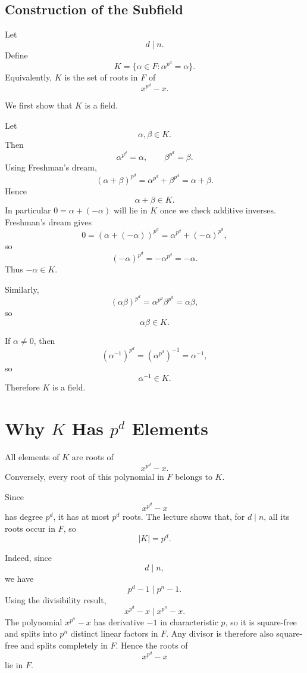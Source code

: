 \documentclass[11pt]{article}
\theoremstyle{remark}
\newcommand{\divides}{\mid}
\begin{document}
\subsection{Construction of the Subfield}

Let
\[
    d\mid n.
\]
Define
\[
    K
    =
    \{\alpha\in F:\alpha^{p^d}=\alpha\}.
\]
Equivalently, $K$ is the set of roots in $F$ of
\[
    x^{p^d}-x.
\]

We first show that $K$ is a field.

Let
\[
    \alpha,\beta\in K.
\]
Then
\[
    \alpha^{p^d}=\alpha,
    \qquad
    \beta^{p^d}=\beta.
\]
Using Freshman's dream,
\[
    (\alpha+\beta)^{p^d}
    =
    \alpha^{p^d}+\beta^{p^d}
    =
    \alpha+\beta.
\]
Hence
\[
    \alpha+\beta\in K.
\]
In particular $0=\alpha+(-\alpha)$ will lie in $K$ once we check additive
inverses. Freshman's dream gives
\[
    0=(\alpha+(-\alpha))^{p^d}
    =
    \alpha^{p^d}+(-\alpha)^{p^d},
\]
so
\[
    (-\alpha)^{p^d}=-\alpha^{p^d}=-\alpha.
\]
Thus $-\alpha\in K$.

Similarly,
\[
    (\alpha\beta)^{p^d}
    =
    \alpha^{p^d}\beta^{p^d}
    =
    \alpha\beta,
\]
so
\[
    \alpha\beta\in K.
\]

If $\alpha\neq0$, then
\[
    (\alpha^{-1})^{p^d}
    =
    (\alpha^{p^d})^{-1}
    =
    \alpha^{-1},
\]
so
\[
    \alpha^{-1}\in K.
\]
Therefore $K$ is a field.

\section{Why $K$ Has $p^d$ Elements}

All elements of $K$ are roots of
\[
    x^{p^d}-x.
\]
Conversely, every root of this polynomial in $F$ belongs to $K$.

Since
\[
    x^{p^d}-x
\]
has degree $p^d$, it has at most $p^d$ roots. The lecture shows that,
for $d\mid n$, all its roots occur in $F$, so
\[
    |K|=p^d.
\]

Indeed, since
\[
    d\mid n,
\]
we have
\[
    p^d-1\mid p^n-1.
\]
Using the divisibility result,
\[
    x^{p^d}-x
    \divides
    x^{p^n}-x.
\]
The polynomial $x^{p^n}-x$ has derivative $-1$ in characteristic $p$, so it
is square-free and splits into $p^n$ distinct linear factors in $F$. Any
divisor is therefore also square-free and splits completely in $F$. Hence
the roots of
\[
    x^{p^d}-x
\]
lie in $F$.
\end{document}
